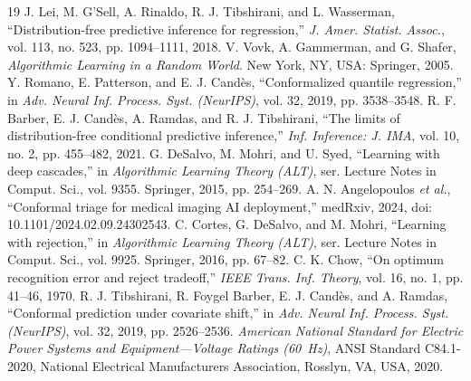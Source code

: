 \documentclass[conference]{IEEEtran}
\begin{document}
\begin{thebibliography}{19}
 J. Lei, M. G'Sell, A. Rinaldo, R. J. Tibshirani, and L. Wasserman, ``Distribution-free predictive inference for regression,'' \textit{J. Amer. Statist. Assoc.}, vol. 113, no. 523, pp. 1094--1111, 2018.
 V. Vovk, A. Gammerman, and G. Shafer, \textit{Algorithmic Learning in a Random World}. New York, NY, USA: Springer, 2005.
 Y. Romano, E. Patterson, and E. J. Cand\`es, ``Conformalized quantile regression,'' in \textit{Adv. Neural Inf. Process. Syst. (NeurIPS)}, vol. 32, 2019, pp. 3538--3548.
 R. F. Barber, E. J. Cand\`es, A. Ramdas, and R. J. Tibshirani, ``The limits of distribution-free conditional predictive inference,'' \textit{Inf. Inference: J. IMA}, vol. 10, no. 2, pp. 455--482, 2021.
 G. DeSalvo, M. Mohri, and U. Syed, ``Learning with deep cascades,'' in \textit{Algorithmic Learning Theory (ALT)}, ser. Lecture Notes in Comput. Sci., vol. 9355. Springer, 2015, pp. 254--269.
 A. N. Angelopoulos \textit{et al.}, ``Conformal triage for medical imaging AI deployment,'' medRxiv, 2024, doi: 10.1101/2024.02.09.24302543.
 C. Cortes, G. DeSalvo, and M. Mohri, ``Learning with rejection,'' in \textit{Algorithmic Learning Theory (ALT)}, ser. Lecture Notes in Comput. Sci., vol. 9925. Springer, 2016, pp. 67--82.
 C. K. Chow, ``On optimum recognition error and reject tradeoff,'' \textit{IEEE Trans. Inf. Theory}, vol. 16, no. 1, pp. 41--46, 1970.
 R. J. Tibshirani, R. Foygel Barber, E. J. Cand\`es, and A. Ramdas, ``Conformal prediction under covariate shift,'' in \textit{Adv. Neural Inf. Process. Syst. (NeurIPS)}, vol. 32, 2019, pp. 2526--2536.
 \textit{American National Standard for Electric Power Systems and Equipment---Voltage Ratings (60~Hz)}, ANSI Standard C84.1-2020, National Electrical Manufacturers Association, Rosslyn, VA, USA, 2020.
\end{thebibliography}
\end{document}
